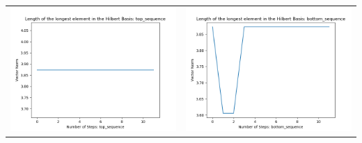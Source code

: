\documentclass[10pt]{article}
\begin{document}
\begin{tabular}{c|c}
\begin{minipage}{.4\textwidth}
\includegraphics[width=\textwidth]{"DATA/4d/5 generators 2 bound E/top_sequence LENGTH"}
\end{minipage} &
\begin{minipage}{.4\textwidth}
\includegraphics[width=\textwidth]{"DATA/4d/5 generators 2 bound E bottomup/bottom_sequence LENGTH"}
\end{minipage}
\end{tabular}
\end{document}
